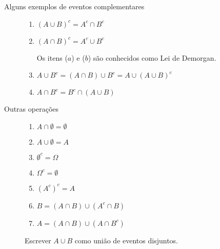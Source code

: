 \begin{description}
\begin{description}
    \item [Alguns exemplos de eventos complementares] 

      \begin{enumerate}[align=left,label=({\alph*}) ]

        \item $(A \cup B )^c = A^c \cap B^c$
          \begin{figure}[H]
            \centering
            
            \caption{}
            \label{figa:7}
          \end{figure}

        \item $(A \cap B)^c = A^c \cup B^c $
          \begin{figure}[H]
            \centering
            
            \caption{}
            \label{figura:8}
          \end{figure}

          Os itens ($a$) e ($b$) são conhecidos como Lei de Demorgan.
        \item $A \cup B^c = ( A \cap B ) \cup B^c = A \cup (A \cup B)^c$
          \begin{figure}[H]
            \centering
            
            \caption{}
            \label{figura:9}

          \end{figure}

        \item  $A \cap B^c = B^c \cap (A \cup B)$
          \begin{figure}[H]
            \centering
            
            \caption{}
            \label{fig:10}
          \end{figure}

      \end{enumerate}

    \item [Outras operações] 

      \begin{enumerate}[leftmargin=*, label=\Roman*., widest=IV, align=left]
        \item     $A \cap \emptyset= \emptyset$ 
        \item     $A \cup \emptyset = A$ 
        \item     $\emptyset^{c} = \Omega$ 
        \item     $ \Omega^c = \emptyset$ 
        \item     $(A^c)^c = A$ 
        \item     $B= (A \cap B)\cup (A^c \cap B)$
        \item     $A= (A \cap B) \cup (A \cap B^c)$
      \end{enumerate}
      \begin{example}
        \label{ex:7}
     Escrever $A \cup B$ como união de eventos disjuntos.


\end{example}
\end{description}
\end{description}
